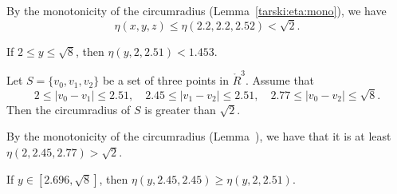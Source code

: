 \begin{tarskidata}
\begin{tarski}
\begin{proved}
By the monotonicity of the circumradius (Lemma~\ref{tarski:eta:mono}), we have
	$$\eta(x,y,z)\le \eta(2.2,2.2,2.52) < \sqrt2.$$
\swallowed\end{proved}
\end{tarski}



\begin{tarski}

\begin{lemma}
If $2\le y\le\sqrt8$, then $\eta(y,2,2.51) < 1.453$.
\end{lemma}

\begin{proved}
\swallowed\end{proved}
\end{tarski}



\begin{tarski}

\begin{lemma}
Let $S=\{v_0,v_1,v_2\}$ be a set of three points in $\ring{R}^3$.
Assume that 
  $$
  2\le|v_0-v_1|\le 2.51,\quad 2.45\le|v_1-v_2|\le 2.51,
  \quad 2.77\le |v_0-v_2|\le \sqrt8.
  $$
Then the circumradius of $S$ is greater than $\sqrt2$.
\end{lemma}


\begin{proved}
By the monotonicity of the circumradius (Lemma~), 
we have
that it is at least $\eta(2,2.45,2.77) > \sqrt2$.
\swallowed\end{proved}
\end{tarski}





\begin{tarski}

\begin{lemma}
If $y\in[2.696,\sqrt8]$, then
$\eta(y,2.45,2.45)\ge\eta(y,2,2.51)$.
\end{lemma}


\end{tarski}
\end{tarskidata}
